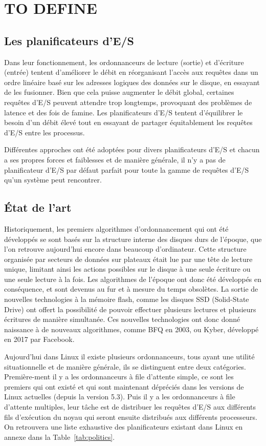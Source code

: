 \section{TO DEFINE}
\label{context}

\subsection{Les planificateurs d'E/S}

Dans leur fonctionnement, les ordonnanceurs de lecture (sortie) et d'écriture 
(entrée) tentent d'améliorer le débit en réorganisant l'accès aux requêtes dans 
un ordre linéaire basé sur les adresses logiques des données sur le disque, en 
essayant de les fusionner. Bien que cela puisse augmenter le débit global, 
certaines requêtes d'E/S peuvent attendre trop longtemps, provoquant des 
problèmes de latence et des fois de famine. Les planificateurs d'E/S tentent 
d'équilibrer le besoin d'un débit élevé tout en essayant de partager 
équitablement les requêtes d'E/S entre les processus.

Différentes approches ont été adoptées pour divers planificateurs d'E/S et 
chacun a ses propres forces et faiblesses et de manière générale, il n'y a pas 
de planificateur d'E/S par défaut parfait pour toute la gamme de requêtes d'E/S 
qu'un système peut rencontrer. 

\subsection{État de l'art}

Historiquement, les premiers algorithmes d'ordonnancement qui ont été 
développés se sont basés sur la structure interne des disques durs de l'époque, 
que l'on retrouve aujourd'hui encore dans beaucoup d'ordinateur. Cette 
structure organisée par secteurs de données sur plateaux était lue par une tête 
de lecture unique, limitant ainsi les actions possibles sur le disque à une 
seule écriture ou une seule lecture à la fois. Les algorithmes de l'époque ont 
donc été développés en conséquence, et sont devenus au fur et à mesure du 
temps obsolètes. La sortie de nouvelles technologies à la mémoire flash, comme 
les disques SSD (Solid-State Drive) ont offert la possibilité de pouvoir 
effectuer plusieurs lectures et plusieurs écritures de manière simultanée. Ces 
nouvelles technologies ont donc donné naissance à de nouveaux algorithmes, 
comme BFQ en 2003, ou Kyber, développé en 2017 par Facebook.

Aujourd'hui dans Linux il existe plusieurs ordonnanceurs, tous ayant une 
utilité situationnelle et de manière générale, ils se distinguent entre deux 
catégories. Première-ment il y a les ordonnanceurs à file d'attente simple, ce 
sont les premiers qui ont existé et qui sont maintenant dépréciés dans les 
versions de Linux actuelles (depuis la version 5.3). Puis il y a les 
ordonnanceurs à file d'attente multiples, leur tâche est de distribuer les 
requêtes d'E/S aux différents fils d'exécution du noyau qui seront ensuite 
distribués aux différents processeurs. On retrouvera une liste exhaustive des 
planificateurs existant dans Linux en annexe dans la Table~\ref{tab:politics}.

